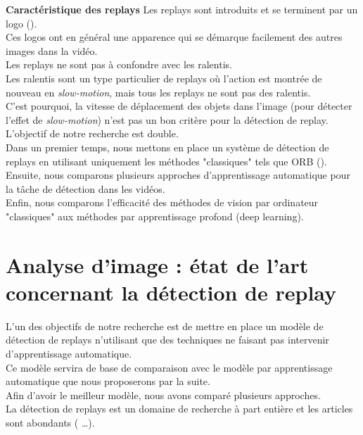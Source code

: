 \documentclass[11pt]{article}
\begin{document}
\textbf{Caractéristique des replays} Les replays sont introduits et se terminent par un logo (\cite{Hao_Pan_2002}).\\
Ces logos ont en général une apparence qui se démarque facilement des autres images dans la vidéo.\\
Les replays ne sont pas à confondre avec les ralentis.\\
Les ralentis sont un type particulier de replays où l'action est montrée de nouveau en \emph{slow-motion}, mais tous les replays ne sont pas des ralentis.\\
C'est pourquoi, la vitesse de déplacement des objets dans l'image (pour détecter l'effet de \emph{slow-motion}) n'est pas un bon critère pour la détection de replay.\\

L'objectif de notre recherche est double.\\
Dans un premier temps, nous mettons en place un système de détection de replays en utilisant uniquement les méthodes "classiques" tels que ORB (\cite{Rublee_2011}).\\
Ensuite, nous comparons plusieurs approches d'apprentissage automatique pour la tâche de détection dans les vidéos.\\
Enfin, nous comparons l'efficacité des méthodes de vision par ordinateur "classiques" aux méthodes par apprentissage profond (deep learning).\\

\newpage
\section{Analyse d'image : état de l'art concernant la détection de replay}
\label{sec:org5d6ebdf}
L'un des objectifs de notre recherche est de mettre en place un modèle de détection de replays n'utilisant que des techniques ne faisant pas intervenir d'apprentissage automatique.\\
Ce modèle servira de base de comparaison avec le modèle par apprentissage automatique que nous proposerons par la suite.\\
Afin d'avoir le meilleur modèle, nous avons comparé plusieurs approches.\\

La détection de replays est un domaine de recherche à part entière et les articles sont abondants (\cite{Hao_Pan_2002,Ling_Yu_Duan,Chu_2015,Javed_2019} \ldots{}).\\
\end{document}
